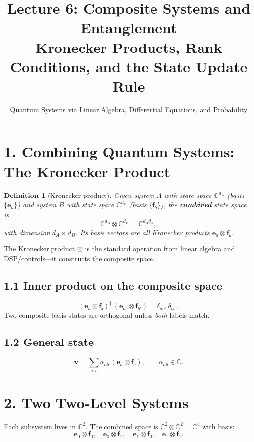 \documentclass[12pt,a4paper]{article}
\title{\textbf{Lecture 6: Composite Systems and Entanglement} \\ \large Kronecker Products, Rank Conditions, and the State Update Rule}
\author{Quantum Systems via Linear Algebra, Differential Equations, and Probability}
\date{}
\newtheorem{definition}{Definition}
\begin{document}
\maketitle
\thispagestyle{fancy}

\section{1. Combining Quantum Systems: The Kronecker Product}

\begin{definition}[Kronecker product]
Given system $A$ with state space $\mathbb{C}^{d_A}$ (basis $\{\mathbf{e}_a\}$) and system $B$ with state space $\mathbb{C}^{d_B}$ (basis $\{\mathbf{f}_b\}$), the \textbf{combined} state space is
\[
    \mathbb{C}^{d_A} \otimes \mathbb{C}^{d_B} = \mathbb{C}^{d_A d_B},
\]
with dimension $d_A \times d_B$.  Its basis vectors are all Kronecker products $\mathbf{e}_a \otimes \mathbf{f}_b$.
\end{definition}

\noindent The Kronecker product $\otimes$ is the standard operation from linear algebra and DSP/controls---it constructs the composite space.

\subsection{1.1 Inner product on the composite space}
\[
    (\mathbf{e}_a \otimes \mathbf{f}_b)^\dagger\,(\mathbf{e}_{a'} \otimes \mathbf{f}_{b'}) = \delta_{aa'}\,\delta_{bb'}.
\]
Two composite basis states are orthogonal unless \emph{both} labels match.

\subsection{1.2 General state}
\[
    \mathbf{v} = \sum_{a,b} \alpha_{ab}\,(\mathbf{e}_a \otimes \mathbf{f}_b), \qquad \alpha_{ab}\in\mathbb{C}.
\]

\section{2. Two Two-Level Systems}

Each subsystem lives in $\mathbb{C}^2$.  The combined space is $\mathbb{C}^2 \otimes \mathbb{C}^2 = \mathbb{C}^4$ with basis:
\[
    \mathbf{e}_0\otimes\mathbf{f}_0,\quad \mathbf{e}_0\otimes\mathbf{f}_1,\quad \mathbf{e}_1\otimes\mathbf{f}_0,\quad \mathbf{e}_1\otimes\mathbf{f}_1.
\]
\end{document}

